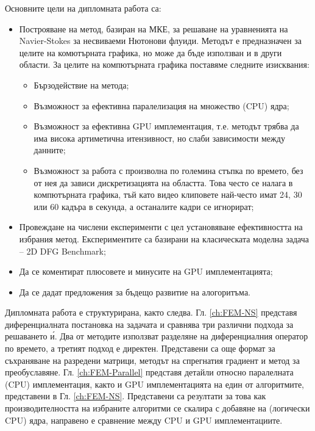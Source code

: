 \documentclass[12pt]{report}
\begin{document}
Основните цели на дипломната работа са:
\begin{itemize}
    \item Построяване на метод, базиран на МКЕ, за решаване на уравненията на Navier-Stokes за несвиваеми Нютонови флуиди. Методът е предназначен за целите на комютърната графика, но може да бъде използван и в други области. За целите на компютърната графика поставяме следните изисквания:
    \begin{itemize}
        \item Бързодействие на метода;
        \item Възможност за ефективна паралелизация на множество (CPU) ядра;
        \item Възможност за ефективна GPU имплементация, т.е. методът трябва да има висока артиметична итензивност, но слаби зависимости между данните;
        \item Възможност за работа с произволна по големина стъпка по времето, без от нея да зависи дискретизацията на областта. Това често се налага в компютърната графика, тъй като видео клиповете най-често имат 24, 30 или 60 кадъра в секунда, а останалите кадри се игнорират;
    \end{itemize}
    \item Провеждане на числени експерименти с цел установяване ефективността на избрания метод. Експериментите са базирани на класическата моделна задача -- 2D DFG Benchmark;
    \item Да се коментират плюсовете и минусите на GPU имплементацията;
    \item Да се дадат предложения за бъдещо развитие на алогоритъма.
\end{itemize}


Дипломната работа е структурирана, както следва. Гл. \ref{ch:FEM-NS} представя диференциалната постановка на задачата и сравнява три различни подхода за решаването \'{и}. Два от методите използват разделяне на диференциалния оператор по времето, а третият подход е директен. Представени са още формат за съхраняване на разредени матрици, методът на спрегнатия градиент и метод за преобуславяне. Гл. \ref{ch:FEM-Parallel} представя детайли относно паралелната (CPU) имплементация, както и GPU имплементацията на един от алгоритмите, представени в Гл. \ref{ch:FEM-NS}. Представени са резултати за това как производителността на избраните алгоритми се скалира с добавяне на (логически CPU) ядра, направено е сравнение между CPU и GPU имплементациите. 
\end{document}
